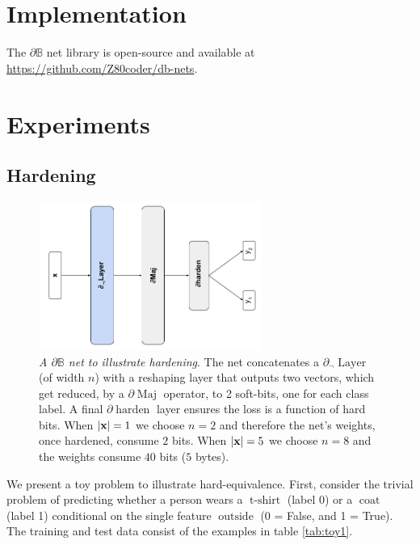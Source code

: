 \documentclass{article} %
\begin{document}
\section{Implementation}

The $\partial\mathbb{B}$ net library is open-source and available at {\small \url{https://github.com/Z80coder/db-nets}}.

\section{Experiments}

\subsection{Hardening}

\begin{figure}[t!]
	\centering
	\includegraphics[width=0.65\textwidth]{toy-example-architecture.png}
	\caption{{\em A $\partial\mathbb{B}$ net to illustrate hardening}. The net concatenates a $\partial_{\neg}\!\operatorname{Layer}$ (of width $n$) with a reshaping layer that  outputs two vectors, which get reduced, by a $\partial\!\operatorname{Maj}$ operator,  to 2 soft-bits, one for each class label. A final $\partial\!\operatorname{harden}$ layer ensures the loss is a function of hard bits. When $|{\bf x}|=1$ we choose $n=2$ and therefore the net's weights, once hardened, consume $2$ bits. When $|{\bf x}|=5$ we choose $n=8$ and the weights consume $40$ bits ($5$ bytes).}
	\label{fig:toy-example-architecture}
\end{figure}

We present a toy problem to illustrate hard-equivalence. First, consider the trivial problem of predicting whether a person wears a $\operatorname{t-shirt}$ (label 0) or a $\operatorname{coat}$ (label 1) conditional on the single feature $\operatorname{outside}$ (0 = False, and 1 = True). The training and test data consist of the examples in table \ref{tab:toy1}.
\end{document}
